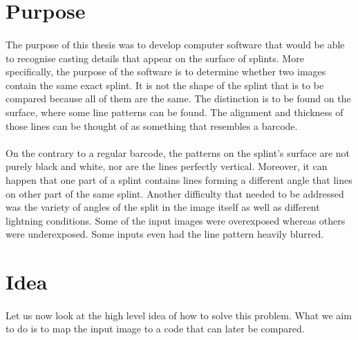 \section{Purpose}
\paragraph{}
The purpose of this thesis was to develop computer software that would be able to recognise casting details that appear on the surface of splints. More specifically, the purpose of the software is to determine whether two images contain the same exact splint. It is not the shape of the splint that is to be compared because all of them are the same. The distinction is to be found on the surface, where some line patterns can be found. The alignment and thickness of those lines can be thought of as something that resembles a barcode. 
\paragraph{}
On the contrary to a regular barcode, the patterns on the splint's surface are not purely black and white, nor are the lines perfectly vertical. Moreover, it can happen that one part of a splint contains lines forming a different angle that lines on other part of the same splint. Another difficulty that needed to be addressed was the variety of angles of the split in the image itself as well as different lightning conditions. Some of the input images were overexposed whereas others were underexposed. Some inputs even had the line pattern heavily blurred. 

\section{Idea}
\paragraph{}
Let us now look at the high level idea of how to solve this problem. What we aim to do is to map the input image to a code that can later be compared.
